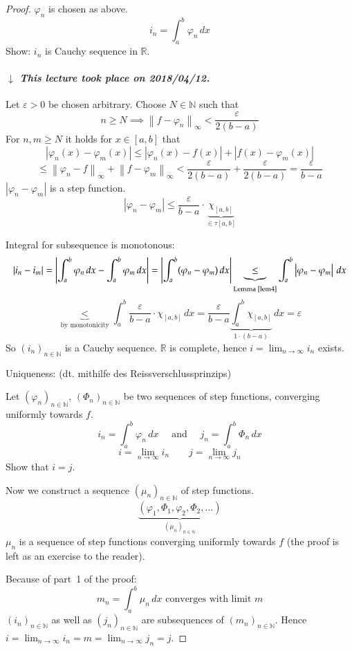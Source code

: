 \documentclass{article}
\newcommand{\norm}[1]{\left\|#1\right\|}
\newcommand{\card}[1]{\left|#1\right|}
\newcommand{\dateref}[1]{%
  \begin{mdframed}[backgroundcolor=gray!10,innerbottommargin=0pt,innertopmargin=0pt]
    \paragraph{\textit{$\downarrow$ This lecture took place on #1.}}%
  \end{mdframed}%
}
\begin{document}
\begin{proof}
  $\varphi_n$ is chosen as above.
  \[ i_n = \int_a^b \varphi_n \, dx \]
  Show: $i_n$ is Cauchy sequence in $\mathbb R$.

  \dateref{2018/04/12}

  Let $\varepsilon > 0$ be chosen arbitrary. Choose $N \in \mathbb N$ such that
  \[ n \geq N \implies \norm{f - \varphi_n}_{\infty} < \frac{\varepsilon}{2 (b - a)} \]
  For $n,m \geq N$ it holds for $x \in [a,b]$ that
  \[ \card{\varphi_n(x) - \varphi_m(x)} \leq \card{\varphi_n(x) - f(x)} + \card{f(x) - \varphi_m(x)} \]
  \[
    \leq \norm{\varphi_n - f}_\infty + \norm{f - \varphi_m}_{\infty}
    < \frac{\varepsilon}{2 (b - a)} + \frac{\varepsilon}{2 (b - a)} = \frac{\varepsilon}{b - a}
  \]
  $\card{\varphi_n - \varphi_m}$ is a step function.
  \[ \card{\varphi_n - \varphi_m} \leq \frac{\varepsilon}{b - a} \cdot \underbrace{\chi_{[a,b]}}_{\in \tau[a,b]} \]

  Integral for subsequence is monotonous:
  \[
    \card{i_n - i_m} = \card{\int_a^b \varphi_n \, dx - \int_a^b \varphi_m \, dx}
    = \card{\int_a^b (\varphi_n - \varphi_m) \, dx} \underbrace{\leq}_{\text{Lemma~\ref{lem4}}} \int_a^b \card{\varphi_n - \varphi_m} \, dx
  \] \[
    \underbrace{<}_{\text{by monotonicity}}
    \int_a^b \frac{\varepsilon}{b - a} \cdot \chi_{[a,b]} \, dx
    = \frac{\varepsilon}{b - a} \underbrace{\int_a^b \chi_{[a,b]}}_{1 \cdot (b - a)} \, dx
    = \varepsilon
  \]
  So $(i_n)_{n \in \mathbb N}$ is a Cauchy sequence.
  $\mathbb R$ is complete, hence $i = \lim_{n\to\infty} i_n$ exists.

  Uniqueness: (dt. \foreignlanguage{german}{mithilfe des Reissverschlussprinzips})

  Let $(\varphi_n)_{n \in \mathbb N}$, $(\Phi_n)_{n \in \mathbb N}$ be two sequences of step functions,
  converging uniformly towards $f$.
  \[
    i_n = \int_a^b \varphi_n \, dx \quad \text{ and } \quad j_n = \int_a^b \Phi_n \, dx
  \] \[
    i = \lim_{n\to\infty} i_n \qquad j = \lim_{n\to\infty} j_n
  \]
  Show that $i = j$.

  Now we construct a sequence $(\mu_n)_{n \in \mathbb N}$ of step functions.
  \[ \underbrace{(\varphi_1, \Phi_1, \varphi_2, \Phi_2, \dots)}_{(\mu_n)_{n \in \mathbb N}} \]
  $\mu_n$ is a sequence of step functions converging uniformly towards $f$ (the proof is left as an exercise to the reader).

  Because of part~1 of the proof:
  \[ m_n = \int_a^b \mu_n \, dx \text{ converges with limit } m \]
  $(i_n)_{n\in\mathbb N}$ as well as $(j_n)_{n \in \mathbb N}$ are subsequences of $(m_n)_{n \in \mathbb N}$.
  Hence $i = \lim_{n\to\infty} i_n = m = \lim_{n\to\infty} j_n = j$.
\end{proof}
\end{document}
